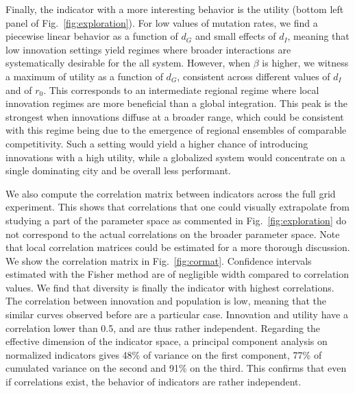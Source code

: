 \documentclass[letterpaper]{article}
\begin{document}
Finally, the indicator with a more interesting behavior is the utility (bottom left panel of Fig.~\ref{fig:exploration}). For low values of mutation rates, we find a piecewise linear behavior as a function of $d_G$ and small effects of $d_I$, meaning that low innovation settings yield regimes where broader interactions are systematically desirable for the all system. However, when $\beta$ is higher, we witness a maximum of utility as a function of $d_G$, consistent across different values of $d_I$ and of $r_0$. This corresponds to an intermediate regional regime where local innovation regimes are more beneficial than a global integration. This peak is the strongest when innovations diffuse at a broader range, which could be consistent with this regime being due to the emergence of regional ensembles of comparable competitivity. Such a setting would yield a higher chance of introducing innovations with a high utility, while a globalized system would concentrate on a single dominating city and be overall less performant.




We also compute the correlation matrix between indicators across the full grid experiment. This shows that correlations that one could visually extrapolate from studying a part of the parameter space as commented in Fig.~\ref{fig:exploration} do not correspond to the actual correlations on the broader parameter space. Note that local correlation matrices could be estimated for a more thorough discussion. We show the correlation matrix in Fig.~\ref{fig:cormat}. Confidence intervals estimated with the Fisher method are of negligible width compared to correlation values. We find that diversity is finally the indicator with highest correlations. The correlation between innovation and population is low, meaning that the similar curves observed before are a particular case. Innovation and utility have a correlation lower than 0.5, and are thus rather independent. Regarding the effective dimension of the indicator space, a principal component analysis on normalized indicators gives 48\% of variance on the first component, 77\% of cumulated variance on the second and 91\% on the third. This confirms that even if correlations exist, the behavior of indicators are rather independent.
\end{document}
